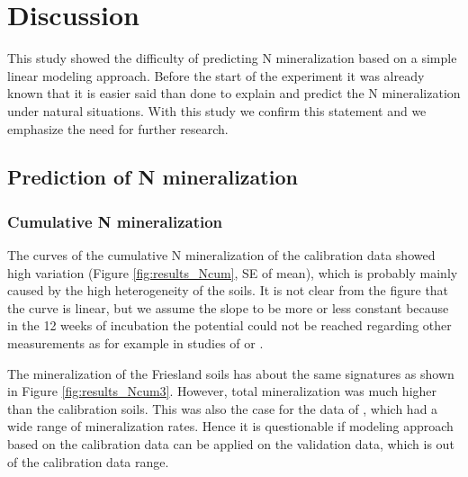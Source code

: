 \documentclass[10pt,twoside,dutch,english]{report}
\begin{document}
\chapter{Discussion}
This study showed the difficulty of predicting N mineralization based on a simple linear modeling approach. Before the start of the experiment it was already known that it is easier said than done to explain and predict the N mineralization under natural situations. With this study we confirm this statement and we emphasize the need for further research. 


\section{Prediction of N mineralization}
\subsection{Cumulative N mineralization}
The curves of the cumulative N mineralization of the calibration data showed high variation (Figure \ref{fig:results_Ncum}, SE of mean), which is probably mainly caused by the high heterogeneity of the soils. It is not clear from the figure that the curve is linear, but we assume the slope to be more or less  constant because in the 12 weeks of incubation the potential could not be reached regarding other measurements as for example in studies of \citet{Ros2011} or \citet{Dessureault-Rompre2013}.

The mineralization of the Friesland soils has about the same signatures as shown in Figure \ref{fig:results_Ncum3}. However, total mineralization was much higher than the calibration soils. This was also the case for the data of \citet{Ros2011}, which had a wide range of mineralization rates. Hence it is questionable if modeling approach based on the calibration data can be applied on the validation data, which is out of the calibration data range. 
	
\end{document}
